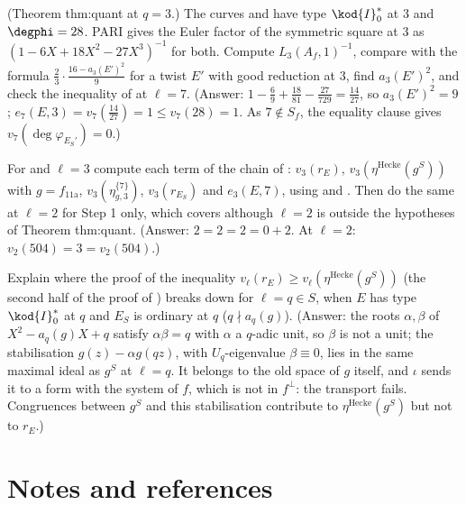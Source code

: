 \begin{exercise}\label{ex:congruence:ex-q3}
(Theorem thm:quant at $q=3$.) The curves  and  have type $\kod{I}_0^*$ at $3$ and $\degphi=28$. PARI gives the Euler factor of the symmetric square at $3$ as $(1-6X+18X^2-27X^3)^{-1}$ for both.
Compute $L_3(A_f,1)^{-1}$, compare with the formula $\frac23\cdot\frac{16-a_3(E')^2}9$ for a twist $E'$ with good reduction at $3$, find $a_3(E')^2$, and check the inequality of  at $\ell=7$.
(Answer: $1-\frac69+\frac{18}{81}-\frac{27}{729}=\frac{14}{27}$, so $a_3(E')^2=9$; $e_7(E,3)=v_7(\frac{14}{27})=1\le v_7(28)=1$. As $7\notin S_f$, the equality clause gives $v_7(\deg\varphi_{E_S'})=0$.)
\end{exercise}

\begin{exercise}\label{ex:congruence:ex-chain}
For  and $\ell=3$ compute each term of the chain of : $v_3(r_E)$, $v_3(\eta^{\mathrm{Hecke}}(g^S))$ with $g=f_{\text{11a}}$, $v_3(\eta^{\{7\}}_{g,3})$, $v_3(r_{E_S})$ and $e_3(E,7)$, using
 and . Then do the same at $\ell=2$ for Step 1 only, which  covers although $\ell=2$ is outside the hypotheses of Theorem thm:quant.
(Answer: $2=2=2=0+2$. At $\ell=2$: $v_2(504)=3=v_2(504)$.)
\end{exercise}

\begin{exercise}\label{ex:congruence:ex-step1-prime}
Explain where the proof of the inequality $v_\ell(r_E)\ge v_\ell(\eta^{\mathrm{Hecke}}(g^S))$ (the second half of the proof of ) breaks down for $\ell=q\in S$, when $E$ has type $\kod{I}_0^*$ at $q$ and $E_S$ is ordinary at $q$
($q\nmid a_q(g)$). (Answer: the roots $\alpha,\beta$ of $X^2-a_q(g)X+q$ satisfy $\alpha\beta=q$ with $\alpha$ a $q$-adic unit, so $\beta$ is not a unit; the stabilisation $g(z)-\alpha g(qz)$, with $U_q$-eigenvalue $\beta\equiv0$, lies in the same
maximal ideal as $g^S$ at $\ell=q$. It belongs to the old space of $g$ itself, and $\iota$ sends it to a form with the system of $f$, which is not in $f^\perp$: the transport fails. Congruences between
$g^S$ and this stabilisation contribute to $\eta^{\mathrm{Hecke}}(g^S)$ but not to $r_E$.)
\end{exercise}

\section{Notes and references}\label{sec:congruence:notes}


